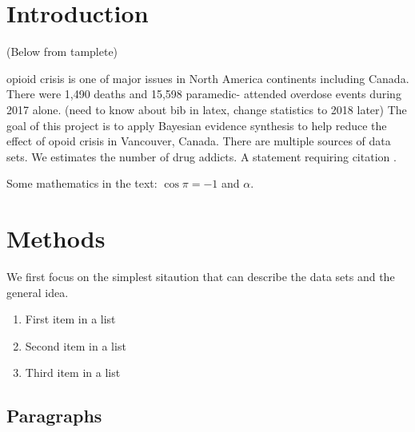 \documentclass[
10pt, %
a4paper, %
oneside, %
headinclude,footinclude, %
BCOR5mm, %
]{scrartcl}
\begin{document}
\newpage %


\section{Introduction}

(Below from tamplete)


opioid crisis is one of major issues in North America continents including Canada. There were 1,490 deaths and 15,598 paramedic- attended overdose events during 2017 alone. \cite{Irvine:modelling} (need to know about bib in latex, change statistics to 2018 later) The goal of this project is to apply Bayesian evidence synthesis to help reduce the effect of opoid crisis in Vancouver, Canada. 
There are multiple sources of data sets. 
We estimates the number of drug addicts.
A statement requiring citation \cite{Figueredo:2009dg}.


\lipsum[1-3] %

Some mathematics in the text: $\cos\pi=-1$ and $\alpha$.
 

\section{Methods}
We first focus on the simplest sitaution that can describe the data sets and the general idea.

\lipsum[5] %

\begin{enumerate}[noitemsep] %
\item First item in a list
\item Second item in a list
\item Third item in a list
\end{enumerate}


\subsection{Paragraphs}
\end{document}
